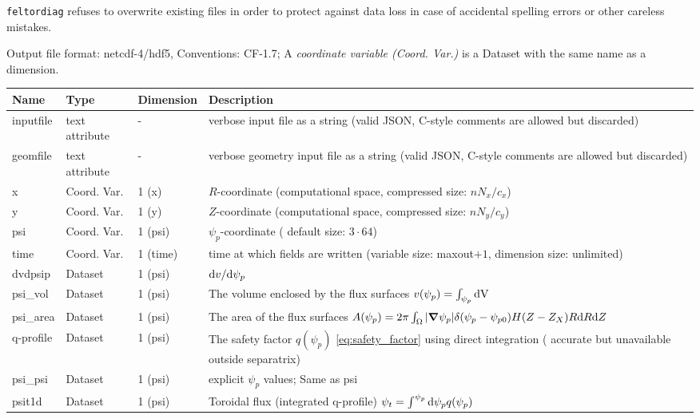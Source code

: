 \begin{tcolorbox}[title=Note]
\texttt{feltordiag} refuses to overwrite existing files in order to protect against data loss in case of accidental spelling
errors or other careless mistakes.
\end{tcolorbox}

Output file format: netcdf-4/hdf5, Conventions: CF-1.7; A \textit{coordinate variable (Coord. Var.)} is a Dataset with the same name as a dimension.

\begin{longtable}{lll>{\RaggedRight}p{7cm}}
\toprule
\rowcolor{gray!50}\textbf{Name} &  \textbf{Type} & \textbf{Dimension} & \textbf{Description}  \\ \midrule
inputfile  &     text attribute & - & verbose input file as a string (valid JSON, C-style comments are allowed but discarded) \\
geomfile   &     text attribute & - & verbose geometry input file as a string (valid JSON, C-style comments are allowed but discarded) \\
x                & Coord. Var. & 1 (x) & $R$-coordinate (computational space, compressed size: $nN_x/c_x$)\\
y                & Coord. Var. & 1 (y) & $Z$-coordinate (computational space, compressed size: $nN_y/c_y$)\\
psi              & Coord. Var. & 1 (psi) & $\psi_p$-coordinate ( default size: $3\cdot 64$) \\
time             & Coord. Var. & 1 (time)& time at which fields are written (variable size: maxout$+1$, dimension size: unlimited) \\
dvdpsip          & Dataset & 1 (psi) & $\mathrm{d} v/\mathrm{d}\psi_p$ \\
psi\_vol         & Dataset & 1 (psi) & The volume enclosed by the flux surfaces $v(\psi_p) = \int_{\psi_p} \mathrm{dV}\, $ \\
psi\_area        & Dataset & 1 (psi) & The area of the flux surfaces $A(\psi_p) = 2\pi \int_\Omega |{\boldsymbol{\nabla}}\psi_p| \delta(\psi_p - \psi_{p0}) H(Z-Z_X) R\mathrm{d} R\mathrm{d} Z$ \\
q-profile        & Dataset & 1 (psi) & The safety factor $q(\psi_p)$ \eqref{eq:safety_factor} using direct integration ( accurate but unavailable outside separatrix) \\
psi\_psi         & Dataset & 1 (psi) & explicit $\psi_p$ values; Same as psi \\
psit1d           & Dataset & 1 (psi) & Toroidal flux (integrated q-profile) $\psi_t = \int^{\psi_p} \mathrm{d}\psi_p q(\psi_p)$ \\

\end{longtable}
